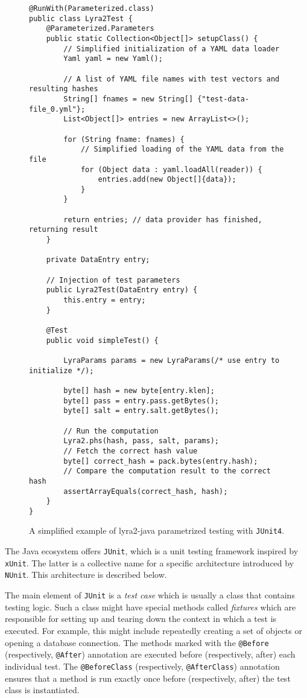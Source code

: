 \begin{figure}
\small
\begin{verbatim}
@RunWith(Parameterized.class)
public class Lyra2Test {
    @Parameterized.Parameters
    public static Collection<Object[]> setupClass() {
        // Simplified initialization of a YAML data loader
        Yaml yaml = new Yaml();

        // A list of YAML file names with test vectors and resulting hashes
        String[] fnames = new String[] {"test-data-file_0.yml"};
        List<Object[]> entries = new ArrayList<>();

        for (String fname: fnames) {
            // Simplified loading of the YAML data from the file
            for (Object data : yaml.loadAll(reader)) {
                entries.add(new Object[]{data});
            }
        }

        return entries; // data provider has finished, returning result
    }

    private DataEntry entry;

    // Injection of test parameters
    public Lyra2Test(DataEntry entry) {
        this.entry = entry;
    }

    @Test
    public void simpleTest() {

        LyraParams params = new LyraParams(/* use entry to initialize */);

        byte[] hash = new byte[entry.klen];
        byte[] pass = entry.pass.getBytes();
        byte[] salt = entry.salt.getBytes();

        // Run the computation
        Lyra2.phs(hash, pass, salt, params);
        // Fetch the correct hash value
        byte[] correct_hash = pack.bytes(entry.hash);
        // Compare the computation result to the correct hash
        assertArrayEquals(correct_hash, hash);
    }
}
\end{verbatim}
\normalsize
\caption{A simplified example of lyra2-java parametrized testing with \texttt{JUnit4}.}
\label{fig:junit4-parametrization}
\end{figure}

The Java ecosystem offers \texttt{JUnit}, which is a unit testing framework inspired by \texttt{xUnit}. The latter is a collective name for a specific architecture introduced by \texttt{NUnit}. This architecture is described below.

The main element of \texttt{JUnit} is a \emph{test case} which is usually a class that contains testing logic. Such a class might have special methods called \emph{fixtures} which are responsible for setting up and tearing down the context in which a test is executed. For example, this might include repeatedly creating a set of objects or opening a database connection. The methods marked with the \texttt{@Before} (respectively, \texttt{@After}) annotation are executed before (respectively, after) each individual test. The \texttt{@BeforeClass} (respectively, \texttt{@AfterClass}) annotation ensures that a method is run exactly once before (respectively, after) the test class is instantiated.

